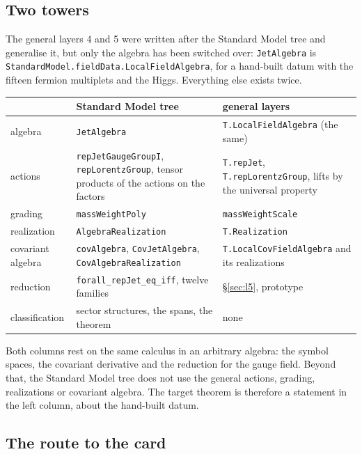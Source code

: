 \documentclass[11pt,a4paper]{article}
\newcommand{\lean}[1]{{\footnotesize\upshape\ttfamily\nolinkurl{#1}}}
\begin{document}
\subsection{Two towers}

The general layers 4 and 5 were written after the Standard Model tree and generalise it, but only the algebra has been switched over: \lean{JetAlgebra} is \lean{StandardModel.fieldData.LocalFieldAlgebra}, for a hand-built datum with the fifteen fermion multiplets and the Higgs. Everything else exists twice.

\begin{center}\small
\begin{tabular}{@{}>{\raggedright\arraybackslash}p{26mm}>{\raggedright\arraybackslash}p{62mm}>{\raggedright\arraybackslash}p{62mm}@{}}
\toprule
 & Standard Model tree & general layers \\
\midrule
algebra & \lean{JetAlgebra} & \lean{T.LocalFieldAlgebra} (the same) \\
\addlinespace[2pt]
actions & \lean{repJetGaugeGroupI}, \lean{repLorentzGroup}, tensor products of the actions on the factors & \lean{T.repJet}, \lean{T.repLorentzGroup}, lifts by the universal property \\
\addlinespace[2pt]
grading & \lean{massWeightPoly} & \lean{massWeightScale} \\
\addlinespace[2pt]
realization & \lean{AlgebraRealization} & \lean{T.Realization} \\
\addlinespace[2pt]
covariant algebra & \lean{covAlgebra}, \lean{CovJetAlgebra}, \lean{CovAlgebraRealization} & \lean{T.LocalCovFieldAlgebra} and its realizations \\
\addlinespace[2pt]
reduction & \lean{forall_repJet_eq_iff}, twelve families & \S\ref{sec:l5}, prototype \\
\addlinespace[2pt]
classification & sector structures, the spans, the theorem & none \\
\bottomrule
\end{tabular}
\end{center}

Both columns rest on the same calculus in an arbitrary algebra: the symbol spaces, the covariant derivative and the reduction for the gauge field. Beyond that, the Standard Model tree does not use the general actions, grading, realizations or covariant algebra. The target theorem is therefore a statement in the left column, about the hand-built datum.

\subsection{The route to the card}
\end{document}
